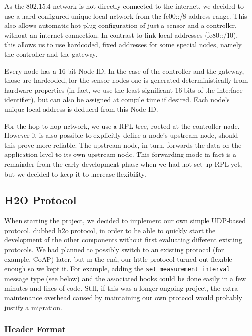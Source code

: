 \documentclass[11pt,paper=a4,parskip=half]{scrartcl}
\begin{document}
As the 802.15.4 network is not directly connected to the internet, we decided
to use a hard-configured unique local network from the fc00::/8 address
range\cite{rfc4193}. This also allows automatic hot-plug configuration of
just a sensor and a controller, without an internet connection. In contrast
to link-local addresses (fe80::/10), this allows us to use hardcoded, fixed
addresses for some special nodes, namely the controller and the gateway.

Every node has a 16 bit Node ID. In the case of the controller and the gateway,
those are hardcoded, for the sensor nodes one is generated deterministically
from hardware properties (in fact, we use the least significant 16 bits of the
interface identifier), but can also be assigned at compile time if desired.
Each node's unique local address is deduced from this Node ID.

For the hop-to-hop network, we use a RPL tree, rooted at the controller node.
However it is also possible to explicitly define a node's upstream node, should
this prove more reliable. The upstream node, in turn, forwards the data on the
application level to its own upstream node. This forwarding mode in fact is a
remainder from the early development phase when we had not set up RPL yet, but
we decided to keep it to increase flexibility.



\subsection{H2O Protocol}
When starting the project, we decided to implement our own simple UDP-based
protocol, dubbed h2o protocol, in order to be able to quickly start the
development of the other components without first evaluating different existing
protocols. We had planned to possibly switch to an existing protocol (for
example, CoAP) later, but in the end, our little protocol turned out flexible
enough so we kept it. For example, adding the \verb`set measurement interval`
message type (see below) and the associated hooks could be done easily in a few
minutes and lines of code. Still, if this was a longer ongoing project, the
extra maintenance overhead caused by maintaining our own protocol would
probably justify a migration.

\subsubsection{Header Format}
\end{document}
